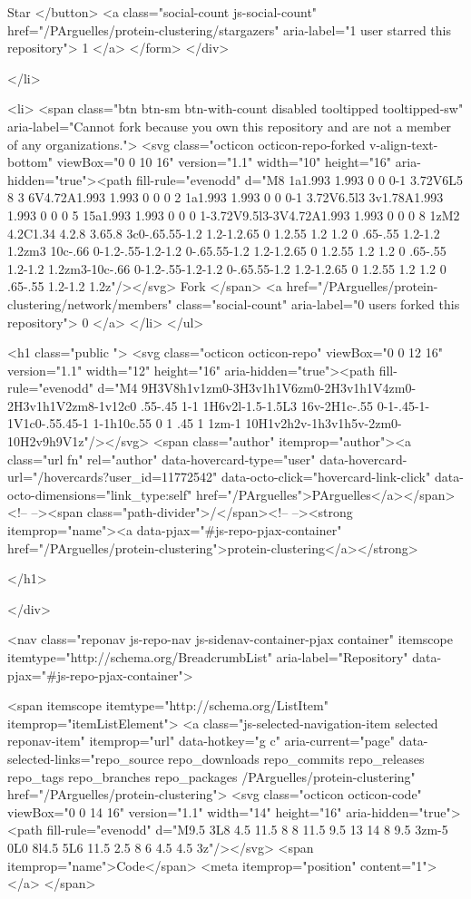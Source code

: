         Star
</button>        <a class="social-count js-social-count" href="/PArguelles/protein-clustering/stargazers"
           aria-label="1 user starred this repository">
          1
        </a>
</form>  </div>

  </li>

  <li>
        <span class="btn btn-sm btn-with-count disabled tooltipped tooltipped-sw" aria-label="Cannot fork because you own this repository and are not a member of any organizations.">
          <svg class="octicon octicon-repo-forked v-align-text-bottom" viewBox="0 0 10 16" version="1.1" width="10" height="16" aria-hidden="true"><path fill-rule="evenodd" d="M8 1a1.993 1.993 0 0 0-1 3.72V6L5 8 3 6V4.72A1.993 1.993 0 0 0 2 1a1.993 1.993 0 0 0-1 3.72V6.5l3 3v1.78A1.993 1.993 0 0 0 5 15a1.993 1.993 0 0 0 1-3.72V9.5l3-3V4.72A1.993 1.993 0 0 0 8 1zM2 4.2C1.34 4.2.8 3.65.8 3c0-.65.55-1.2 1.2-1.2.65 0 1.2.55 1.2 1.2 0 .65-.55 1.2-1.2 1.2zm3 10c-.66 0-1.2-.55-1.2-1.2 0-.65.55-1.2 1.2-1.2.65 0 1.2.55 1.2 1.2 0 .65-.55 1.2-1.2 1.2zm3-10c-.66 0-1.2-.55-1.2-1.2 0-.65.55-1.2 1.2-1.2.65 0 1.2.55 1.2 1.2 0 .65-.55 1.2-1.2 1.2z"/></svg>
          Fork
</span>
    <a href="/PArguelles/protein-clustering/network/members" class="social-count"
       aria-label="0 users forked this repository">
      0
    </a>
  </li>
</ul>

      <h1 class="public ">
  <svg class="octicon octicon-repo" viewBox="0 0 12 16" version="1.1" width="12" height="16" aria-hidden="true"><path fill-rule="evenodd" d="M4 9H3V8h1v1zm0-3H3v1h1V6zm0-2H3v1h1V4zm0-2H3v1h1V2zm8-1v12c0 .55-.45 1-1 1H6v2l-1.5-1.5L3 16v-2H1c-.55 0-1-.45-1-1V1c0-.55.45-1 1-1h10c.55 0 1 .45 1 1zm-1 10H1v2h2v-1h3v1h5v-2zm0-10H2v9h9V1z"/></svg>
  <span class="author" itemprop="author"><a class="url fn" rel="author" data-hovercard-type="user" data-hovercard-url="/hovercards?user_id=11772542" data-octo-click="hovercard-link-click" data-octo-dimensions="link_type:self" href="/PArguelles">PArguelles</a></span><!--
--><span class="path-divider">/</span><!--
--><strong itemprop="name"><a data-pjax="#js-repo-pjax-container" href="/PArguelles/protein-clustering">protein-clustering</a></strong>

</h1>

    </div>
    
<nav class="reponav js-repo-nav js-sidenav-container-pjax container"
     itemscope
     itemtype="http://schema.org/BreadcrumbList"
    aria-label="Repository"
     data-pjax="#js-repo-pjax-container">

  <span itemscope itemtype="http://schema.org/ListItem" itemprop="itemListElement">
    <a class="js-selected-navigation-item selected reponav-item" itemprop="url" data-hotkey="g c" aria-current="page" data-selected-links="repo_source repo_downloads repo_commits repo_releases repo_tags repo_branches repo_packages /PArguelles/protein-clustering" href="/PArguelles/protein-clustering">
      <svg class="octicon octicon-code" viewBox="0 0 14 16" version="1.1" width="14" height="16" aria-hidden="true"><path fill-rule="evenodd" d="M9.5 3L8 4.5 11.5 8 8 11.5 9.5 13 14 8 9.5 3zm-5 0L0 8l4.5 5L6 11.5 2.5 8 6 4.5 4.5 3z"/></svg>
      <span itemprop="name">Code</span>
      <meta itemprop="position" content="1">
</a>  </span>

